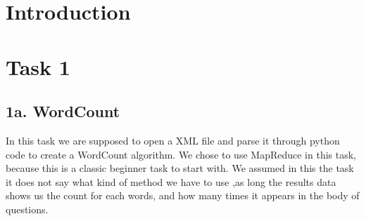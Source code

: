 \documentclass[fleqn,10pt]{wlscirep}
\title{}
\author{}
\begin{document}




\section{Introduction}

\section{Task 1}

\subsection{1a. WordCount}
In this task we are supposed to open a XML  file and parse it through python code to create a WordCount algorithm. We chose to use MapReduce in this task,  because this is a classic beginner task to start with. We assumed in this the task it does not say what kind of method we have to use ,as long the results data shows us the count for each words, and how many times it appears in the body of questions. 
\flushbottom
\maketitle
\end{document}
